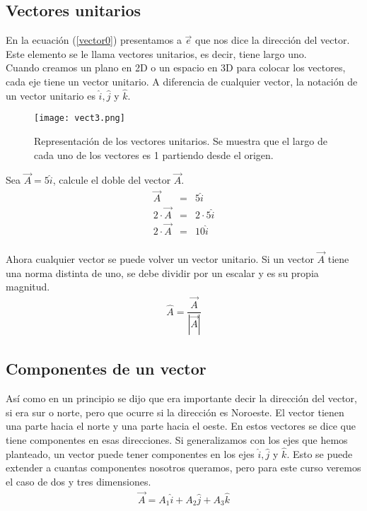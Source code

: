 \subsection{Vectores unitarios}

En la ecuación (\ref{vector0}) presentamos a $\vec{e}$ que nos dice la dirección del vector. Este elemento se le llama vectores unitarios, es decir, tiene largo uno.\\
Cuando creamos un plano en 2D o un espacio en 3D para colocar los vectores, cada eje tiene un vector unitario. A diferencia de cualquier vector, la notación de un vector unitario es $\hat{i}, \hat{j}$ y $\hat{k}$.

 \begin{center}
\begin{figure}[h!]
\centering
\texttt{[image: vect3.png]}
\caption[Representación de los vectores unitarios.]{Representación de los vectores unitarios. Se muestra que el largo de cada uno de los vectores es 1 partiendo desde el origen.} \label{vect3}
\end{figure}
\end{center}

\begin{myexample}
Sea $\vec{A}=5\hat{i}$, calcule el doble del vector $\vec{A}$.
\begin{eqnarray*}
\vec{A}&=&5\hat{i}\\
2\cdot\vec{A}&=&2\cdot 5\hat{i}\\
2\cdot\vec{A}&=&10\hat{i}\\
\end{eqnarray*}
\end{myexample}

Ahora cualquier vector se puede  volver un vector unitario. Si un vector $\vec{A}$ tiene una norma distinta de uno, se debe dividir por un escalar y es su propia magnitud.
\begin{eqnarray}
\hat{A}=\dfrac{\vec{A}}{|\vec{A}|}
\end{eqnarray}

\subsection{Componentes de un vector}

Así como en un principio se dijo que era importante decir la dirección del vector, si era sur o norte, pero que ocurre si la dirección es Noroeste. El vector tienen una parte hacia el norte y una parte hacia el oeste. En estos vectores se dice que tiene componentes en esas direcciones. Si generalizamos con los ejes que hemos planteado, un vector puede tener componentes en los ejes $\hat{i}, \hat{j}$ y $\hat{k}$. Esto se puede extender a cuantas componentes nosotros queramos, pero para este curso veremos el caso de dos y tres dimensiones.
\begin{eqnarray}
\vec{A}=A_{1}\hat{i}+A_{2}\hat{j}+A_{3}\hat{k}
\label{vector1}
\end{eqnarray}

